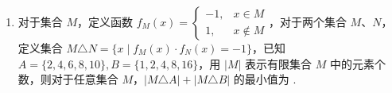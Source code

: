 \documentclass[a4paper,11pt]{article}
\begin{document}
\begin{enumerate}
其中，真命题的编号为 \blankline[4.4em]（写出所有真命题的编号）.


\item 对于集合 $M$，定义函数 $f_M(x)=\begin{cases}-1,&x\in M\\ 1,&x\notin M\end{cases}$，对于两个集合 $M$、$N$，定义集合
$M\triangle N=\{x\mid f_M(x)\cdot f_N(x)=-1\}$，已知 $A=\{2,4,6,8,10\},B=\{1,2,4,8,16\}$，用 $|M|$ 表示有限集合 $M$ 中的元素个数，则对于任意集合 $M$，$|M\triangle A|+|M\triangle B|$ 的最小值为 \blankline[2.4em].


\ifanswer
\solbegin
\solend

\fi

\end{enumerate}

\end{document}
